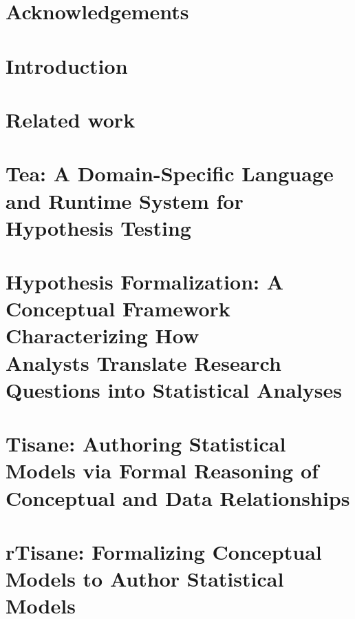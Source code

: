 \documentclass[11pt]{book}
\begin{document}
% 






{} %



\chapter*{Acknowledgements}



\tableofcontents{}
\listoffigures
\listoftables
\clearpage

\chapter {Introduction}


\chapter {Related work}
\label{chapter:relatedWork}


\chapter{Tea: A Domain-Specific Language and Runtime System for Hypothesis Testing} %
\label{chapter:tea}


\chapter{Hypothesis Formalization: A Conceptual Framework Characterizing How\\Analysts Translate Research Questions into Statistical Analyses} %
\label{chapter:hypoForm}


\chapter{Tisane: Authoring Statistical Models via Formal Reasoning of Conceptual and Data Relationships}
\label{chapter:tisane}


\chapter{rTisane: Formalizing Conceptual Models to Author Statistical Models}
\label{chapter:rTisane}

\end{document}
